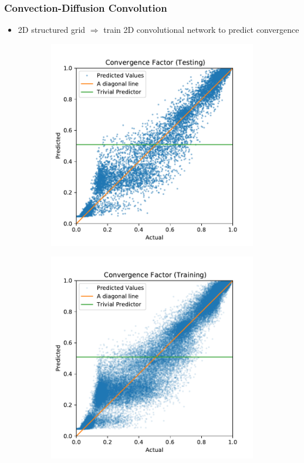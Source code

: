 \documentclass[handout]{beamer}
\begin{document}
\begin{frame}
  \frametitle{Convection-Diffusion Convolution}
  \begin{itemize}
    \item 2D structured grid $\Rightarrow$ train 2D convolutional network to predict convergence
  \end{itemize}
  \begin{figure}[h]
  \centering
  \begin{subfigure}{.48\textwidth}
    \includegraphics[width=\textwidth]{figures/cnn_test.pdf}
  \end{subfigure}
  \begin{subfigure}{.48\textwidth}
    \includegraphics[width=\textwidth]{figures/cnn_train.pdf}
  \end{subfigure}
\end{figure}
\end{frame}
\end{document}
